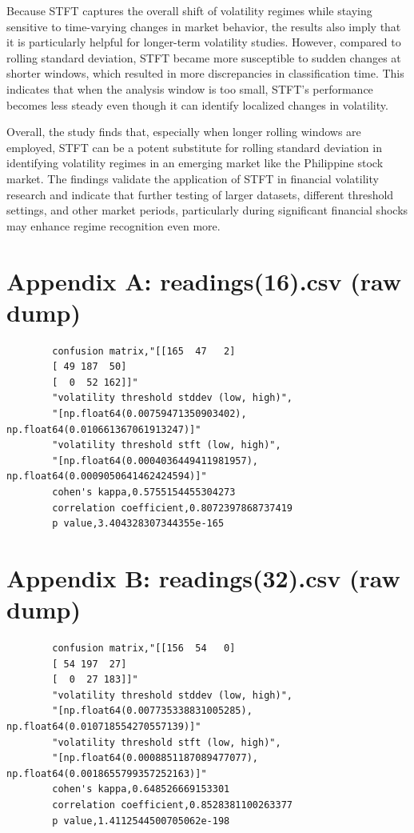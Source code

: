 \documentclass[12pt,letterpaper]{article}
\begin{document}
		
		Because STFT captures the overall shift of volatility regimes while staying sensitive to time-varying changes in market behavior, the results also imply that it is particularly helpful for longer-term volatility studies. However, compared to rolling standard deviation, STFT became more susceptible to sudden changes at shorter windows, which resulted in more discrepancies in classification time. This indicates that when the analysis window is too small, STFT's performance becomes less steady even though it can identify localized changes in volatility.
		
		Overall, the study finds that, especially when longer rolling windows are employed, STFT can be a potent substitute for rolling standard deviation in identifying volatility regimes in an emerging market like the Philippine stock market. The findings validate the application of STFT in financial volatility research and indicate that further testing of larger datasets, different threshold settings, and other market periods, particularly during significant financial shocks may enhance regime recognition even more.
		
	\printbibliography
	
	\appendix
	
	\section{Appendix A: readings(16).csv (raw dump)}
	\begin{verbatim}
		confusion matrix,"[[165  47   2]
		[ 49 187  50]
		[  0  52 162]]"
		"volatility threshold stddev (low, high)",
		"[np.float64(0.00759471350903402), np.float64(0.010661367061913247)]"
		"volatility threshold stft (low, high)",
		"[np.float64(0.0004036449411981957), np.float64(0.0009050641462424594)]"
		cohen's kappa,0.5755154455304273
		correlation coefficient,0.8072397868737419
		p value,3.404328307344355e-165
	\end{verbatim}
	
	\section{Appendix B: readings(32).csv (raw dump)}
	\begin{verbatim}
		confusion matrix,"[[156  54   0]
		[ 54 197  27]
		[  0  27 183]]"
		"volatility threshold stddev (low, high)",
		"[np.float64(0.007735338831005285), np.float64(0.010718554270557139)]"
		"volatility threshold stft (low, high)",
		"[np.float64(0.0008851187089477077), np.float64(0.0018655799357252163)]"
		cohen's kappa,0.648526669153301
		correlation coefficient,0.8528381100263377
		p value,1.4112544500705062e-198
	\end{verbatim}
	
\end{document}
